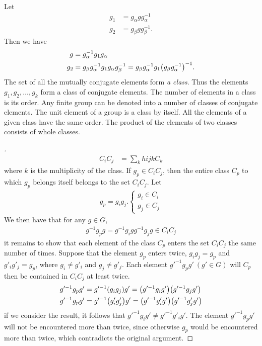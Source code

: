 Let
\begin{align}
    g_1&=g_\alpha gg_\alpha^{-1}\\
    g_2&=g_\beta gg_\beta^{-1}.
\end{align}
Then we have
\begin{align}
    g&=g_{\alpha}^{-1}g_1g_\alpha\\
    g_2&=g_\beta g_\alpha^{-1}g_1g_\alpha g_\beta^{-1}=
    g_\beta g_\alpha^{-1}g_1\qty(g_\beta g_\alpha^{-1})^{-1}.
\end{align}
The set of all the mutually conjugate elements form \emph{a class}. Thus the
elements $g_1,g_2,\dots,g_k$ form a class of conjugate elements. The number of
elements in a class is its order. Any finite group can be denoted into a number
of classes of conjugate elements. The unit element of a group is a class by itself.
All the elements of a given class have the same order. The product of the elements
of two classes consists of whole classes.
\begin{proof}[]
    \begin{align}
        C_iC_j&=\sum_k hijk C_k
    \end{align}
    where $k$ is the multiplicity of the class.
    If $g_p\in C_iC_j$, then the entire class $C_p$ to which $g_p$ belongs
    itself belongs to the set $C_iC_j$. Let
    \begin{align}
        g_p=g_ig_j.
        \begin{cases}
            g_i\in C_i\\
            g_j\in C_j
        \end{cases}
    \end{align}
    We then have that for any $g\in G$,
    \begin{align}
        g^{-1}g_pg=g^{-1}g_igg^{-1}g_jg\in C_iC_j
    \end{align}
    it remains to show that each element of the class $C_p$ enters the set
    $C_iC_j$ the same number of times. Suppose that the element $g_p$ enters
    twice, $g_ig_j=g_p$ and $g'_ig'_j=g_p$, where $g_i\neq g'_i$ and
    $g_j\neq g'_j$. Each element $g'^{-1}g_pg'\ (g'\in G)$ will $C_p$ then be
    contained in $C_iC_j$ at least twice.
    \begin{align}
        g'^{-1}g_pg'&=g'^{-1}\qty(g_ig_j)g'=
        \qty(g'^{-1}g_ig')\qty(g'^{-1}g_jg')\\
        g'^{-1}g_pg'&=g'^{-1}\qty(g'_ig'_j)g'=
        \qty(g'^{-1}g'_ig')\qty(g'^{-1}g'_jg')
    \end{align}
    if we consider the result, it follows that $g'^{-1}g_ig'\neq g'^{-1}g'_ig'$.
    The element $g'^{-1}g_pg'$ will not be encountered more than twice, since
    otherwise $g_p$ would be encountered more than twice, which contradicts the
    original argument.
\end{proof}

